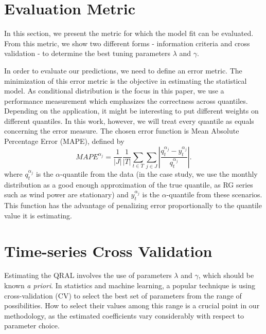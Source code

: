 \section{Evaluation Metric}

In this section, we present the metric for which the model fit can be evaluated. From this metric, we show two different forms - information criteria and cross validation - to determine the best tuning parameters $\lambda$ and $\gamma$.

In order to evaluate our predictions, we need to define an error metric. The minimization of this error metric is the objective in estimating the statistical model. 
As conditional distribution is the focus in this paper, we use a performance measurement which emphasizes the correctness across quantiles. Depending on the application, it might be interesting to put different weights on different quantiles. In this work, however, we will treat every quantile as equals concerning the error measure.
The chosen error function is Mean Absolute Percentage Error (MAPE), defined by
\begin{equation}
MAPE^{\alpha_j}= \frac{1}{|J|} \frac{1}{|T|}  \sum_{t \in T} \sum_{j \in J} \left| \frac{q_t^{\alpha_{j}}- y_t^{\alpha_{j}}}{q_t^{\alpha_{j}}}  \right|. 
\end{equation}
where $q_t^{\alpha_{j}}$ is the $\alpha$-quantile from the data (in the case study, we use the monthly distribution as a good enough approximation of the true quantile, as RG series such as wind power are stationary) and $y_t^{\alpha_j}$ is the $\alpha$-quantile from these scenarios.
This function has the advantage of penalizing error proportionally to the quantile value it is estimating. 


\section{Time-series Cross Validation} \label{sec:cv}

Estimating the QRAL involves the use of parameters $\lambda$ and $\gamma$, which should be known \textit{a priori}. In statistics and machine learning, a popular technique is using cross-validation (CV) to select the best set of parameters from the range of possibilities. How to select their values among this range is a crucial point in our methodology, as the estimated coefficients vary considerably with respect to parameter choice.


